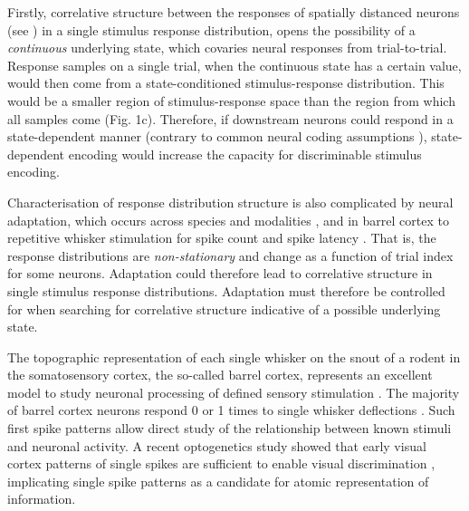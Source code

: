 \documentclass{article}
\begin{document}
Firstly, correlative structure between the responses of spatially distanced neurons (see \cite{reid2012functional, feldmeyer2013barrel}) in a single stimulus response distribution, opens the possibility of a \textit{continuous} underlying state, which covaries neural responses from trial-to-trial. Response samples on a single trial, when the continuous state has a certain value, would then come from a state-conditioned stimulus-response distribution. This would be a smaller region of stimulus-response space than the region from which all samples come (Fig. 1c). Therefore, if downstream neurons could respond in a state-dependent manner (contrary to common neural coding assumptions \cite{moreno2014information, stringer2019high}), state-dependent encoding would increase the capacity for discriminable stimulus encoding.

Characterisation of response distribution structure is also complicated by neural adaptation, which occurs across species and modalities \cite{dragoi2002dynamics, ulanovsky2003processing, sharpee2006adaptive}, and in barrel cortex to repetitive whisker stimulation for spike count \cite{ahissar2000transformation, ahissar2001temporal, kheradpezhouh2017response, khatri2009stimulus, martin2014tactile, barros2019response} and spike latency \cite{ahissar2000transformation, ahissar2001temporal, kheradpezhouh2017response}. That is, the response distributions are \textit{non-stationary} and change as a function of trial index for some neurons. Adaptation could therefore lead to correlative structure in single stimulus response distributions. Adaptation must therefore be controlled for when searching for correlative structure indicative of a possible underlying state.

The topographic representation of each single whisker on the snout of a rodent in the somatosensory cortex, the so-called barrel cortex, represents an excellent model to study neuronal processing of defined sensory stimulation \cite{feldmeyer2013barrel}. The majority of barrel cortex neurons respond 0 or 1 times to single whisker deflections \cite{reyes2014laminar}. Such first spike patterns allow direct study of the relationship between known stimuli and neuronal activity. A recent optogenetics study showed that early visual cortex patterns of single spikes are sufficient to enable visual discrimination \cite{resulaj2018first}, implicating single spike patterns as a candidate for atomic representation of information. 
\end{document}
